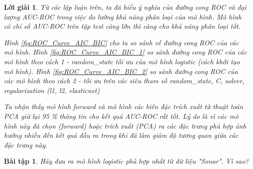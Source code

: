 \documentclass[14pt, a4paper]{article}
\theoremstyle{sltheorem}
\newtheorem{baitap}{Bài tập}
\theoremstyle{soltheorem}
\newtheorem*{loigiai}{Lời giải}
\begin{document}
\begin{loigiai}
        Từ các lập luận trên, ta đã hiểu ý nghĩa của đường cong ROC và đại lượng AUC-ROC trong việc đo lường khả năng phân loại của mô hình.
        Mô hình có chỉ số AUC-ROC trên tập test càng lớn thì càng cho khả năng phân loại tốt.

        Hình \ref{fig:ROC_Curve_AIC_BIC} cho ta so sánh về đường cong ROC của các mô hình.
        Hình \ref{fig:ROC_Curve_AIC_BIC_1} so sánh đường cong ROC của các mô hình theo cách 1 - random\_state tối ưu của mô hình logistic (cách khởi tạo mô hình).
        Hình \ref{fig:ROC_Curve_AIC_BIC_2} so sánh đường cong ROC của các mô hình theo cách 2 - tối ưu trên các siêu tham số random\_state, C, solver, regularization (l1, l2, elasticnet)

        Ta nhận thấy mô hình forward và mô hình các biến đặc trích xuất từ thuật toán PCA giữ lại 95 \% thông tin cho kết quả AUC-ROC rất tốt.
        Lý do là vì các mô hình này đã chọn (forward) hoặc trích xuất (PCA) ra các đặc trưng phù hợp ảnh hưởng nhiều đến kết quả đầu ra trong khi đã làm giảm độ tương quan giữa các đặc trưng này.
\end{loigiai}

\begin{baitap}
    Hãy đưa ra mô hình logistic phù hợp nhất từ dữ liệu "Sonar". Vì sao?
\end{baitap}
\end{document}
